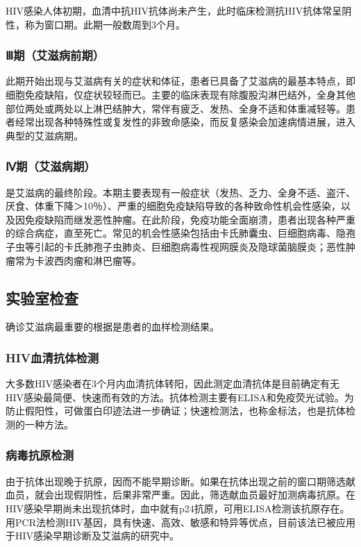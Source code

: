 HIV感染人体初期，血清中抗HIV抗体尚未产生，此时临床检测抗HIV抗体常呈阴性，称为窗口期。此期一般数周到3个月。

\subsubsection{Ⅲ期（艾滋病前期）}

此期开始出现与艾滋病有关的症状和体征，患者已具备了艾滋病的最基本特点，即细胞免疫缺陷，仅症状较轻而已。主要的临床表现有除腹股沟淋巴结外，全身其他部位两处或两处以上淋巴结肿大，常伴有疲乏、发热、全身不适和体重减轻等。患者经常出现各种特殊性或复发性的非致命感染，而反复感染会加速病情进展，进入典型的艾滋病期。

\subsubsection{Ⅳ期（艾滋病期）}

是艾滋病的最终阶段。本期主要表现有一般症状（发热、乏力、全身不适、盗汗、厌食、体重下降＞10％）、严重的细胞免疫缺陷导致的各种致命性机会性感染，以及因免疫缺陷而继发恶性肿瘤。在此阶段，免疫功能全面崩溃，患者出现各种严重的综合病症，直至死亡。常见的机会性感染包括由卡氏肺囊虫、巨细胞病毒、隐孢子虫等引起的卡氏肺孢子虫肺炎、巨细胞病毒性视网膜炎及隐球菌脑膜炎；恶性肿瘤常为卡波西肉瘤和淋巴瘤等。

\subsection{实验室检查}

确诊艾滋病最重要的根据是患者的血样检测结果。

\subsubsection{HIV血清抗体检测}

大多数HIV感染者在3个月内血清抗体转阳，因此测定血清抗体是目前确定有无HIV感染最简便、快速而有效的方法。抗体检测主要有ELISA和免疫荧光试验。为防止假阳性，可做蛋白印迹法进一步确证；快速检测法，也称金标法，也是抗体检测的一种方法。

\subsubsection{病毒抗原检测}

由于抗体出现晚于抗原，因而不能早期诊断。如果在抗体出现之前的窗口期筛选献血员，就会出现假阴性，后果非常严重。因此，筛选献血员最好加测病毒抗原。在HIV感染早期尚未出现抗体时，血中就有p24抗原，可用ELISA检测该抗原存在。用PCR法检测HIV基因，具有快速、高效、敏感和特异等优点，目前该法已被应用于HIV感染早期诊断及艾滋病的研究中。

